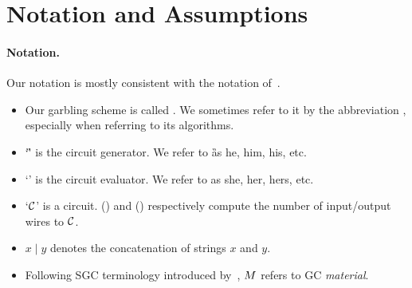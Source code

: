\section{Notation and Assumptions}\label{sec:notation}

\paragraph{Notation.}

Our notation is mostly consistent with the notation of~\HK.

\begin{itemize}
  \item Our garbling scheme is called \ourschemelong. We sometimes
    refer to it by the abbreviation \ourscheme, especially when
    referring to its algorithms.
	\item `\G' is the circuit generator. We refer to \G as
	he, him, his, etc.
	\item `\E' is the circuit evaluator. We refer to \E as
	she, her, hers, etc.
\item `$\mathcal C$' is a circuit. \inpsize(\cir) and \outsize(\cir)
  respectively compute
  the number of input/output wires to $\mathcal C$.
  \item $x \mid y$ denotes the concatenation of strings $x$ and
    $y$.
	\item Following SGC terminology introduced by~\cite{AC:Kolesnikov18}, $M$ refers to GC \emph{material}.

\end{itemize}
